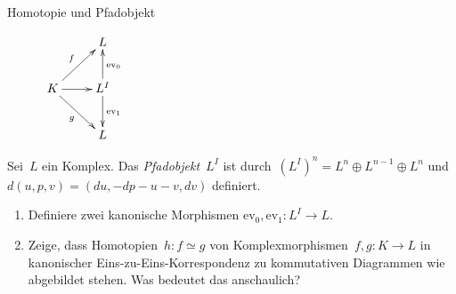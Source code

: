 \documentclass{uebblatt}
\begin{document}
\begin{aufgabe}{Homotopie und Pfadobjekt}
\begin{wrapfigure}{r}{0.05\textwidth}
$\xymatrix{
  & L \\
  K \ar[ru]^f \ar[rd]_g \ar[r] & L^I \ar[d]^{\mathrm{ev}_1}
  \ar[u]_{\mathrm{ev}_0} \\
  & L
}$
\end{wrapfigure}
Sei~$L$ ein Komplex. Das \emph{Pfadobjekt}~$L^I$ ist durch~$(L^I)^n =
L^n \oplus L^{n-1} \oplus L^n$ und~$d(u,p,v) = (du, -dp-u-v, dv)$ definiert.
\begin{enumerate}
\item Definiere zwei kanonische Morphismen $\mathrm{ev}_0, \mathrm{ev}_1 : L^I \to L$.
\item Zeige, dass Homotopien~$h : f \simeq g$ von Komplexmorphismen~$f, g : K \to L$
in kanonischer Eins-zu-Eins-Korrespondenz zu kommutativen Diagrammen wie
abgebildet stehen. Was bedeutet das anschaulich?
\end{enumerate}
\end{aufgabe}
\end{document}
